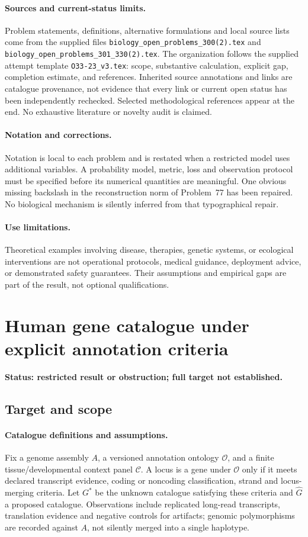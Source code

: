 \documentclass[11pt]{article}
\begin{document}
\paragraph{Sources and current-status limits.}
Problem statements, definitions, alternative formulations and local source lists
come from the supplied files
\texttt{biology\_open\_problems\_300(2).tex} and
\texttt{biology\_open\_problems\_301\_330(2).tex}.
The organization follows the supplied attempt template
\texttt{O33-23\_v3.tex}: scope, substantive calculation, explicit gap,
completion estimate, and references. Inherited source annotations and links are
catalogue provenance, not evidence that every link or current open status has
been independently rechecked. Selected methodological references appear at the
end. No exhaustive literature or novelty audit is claimed.

\paragraph{Notation and corrections.}
Notation is local to each problem and is restated when a restricted model uses
additional variables. A probability model, metric, loss and observation protocol
must be specified before its numerical quantities are meaningful. One obvious
missing backslash in the reconstruction norm of Problem~77 has been repaired.
No biological mechanism is silently inferred from that typographical repair.

\paragraph{Use limitations.}
Theoretical examples involving disease, therapies, genetic systems, or ecological
interventions are not operational protocols, medical guidance, deployment advice,
or demonstrated safety guarantees. Their assumptions and empirical gaps are part
of the result, not optional qualifications.


\section*{Human gene catalogue under explicit annotation criteria}
\label{prob:021}
\noindent\textbf{Status: restricted result or obstruction; full target not established.}
\subsection{Target and scope}
\paragraph{Catalogue definitions and assumptions.}
Fix a genome assembly $A$, a versioned annotation ontology $\mathcal O$, and a finite tissue/developmental context panel $\mathcal C$. A locus is a gene under $\mathcal O$ only if it meets declared transcript evidence, coding or noncoding classification, strand and locus-merging criteria. Let $G^*$ be the unknown catalogue satisfying these criteria and $\widehat G$ a proposed catalogue. Observations include replicated long-read transcripts, translation evidence and negative controls for artifacts; genomic polymorphisms are recorded against $A$, not silently merged into a single haplotype.
\end{document}
